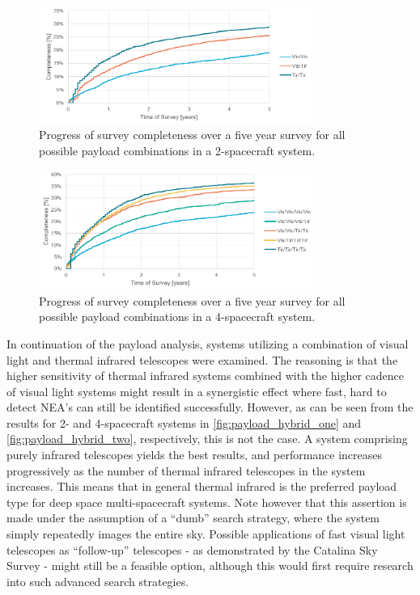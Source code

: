 \begin{figure}[htbp]
 \centering
 \includegraphics[width=0.8\textwidth]{img/tir_vs_vis_2_hybrid.png}
 \caption{Progress of survey completeness over a five year survey for all possible payload combinations in a 2-spacecraft system.}
 \label{fig:payload_hybrid_one}
\end{figure}

\begin{figure}[htbp]
 \centering
 \includegraphics[width=0.8\textwidth]{img/tir_vs_vis_4_hybrid.png}
 \caption{Progress of survey completeness over a five year survey for all possible payload combinations in a 4-spacecraft system.}
 \label{fig:payload_hybrid_two}
\end{figure}

In continuation of the payload analysis, systems utilizing a combination of visual light and thermal infrared telescopes were examined. The reasoning is that the higher sensitivity of thermal infrared systems combined with the higher cadence of visual light systems might result in a synergistic effect where fast, hard to detect NEA's can still be identified successfully. However, as can be seen from the results for 2- and 4-spacecraft systems in \autoref{fig:payload_hybrid_one} and \autoref{fig:payload_hybrid_two}, respectively, this is not the case. A system comprising purely infrared telescopes yields the best results, and performance increases progressively as the number of thermal infrared telescopes in the system increases. This means that in general thermal infrared is the preferred payload type for deep space multi-spacecraft systems. Note however that this assertion is made under the assumption of a ``dumb'' search strategy, where the system simply repeatedly images the entire sky. Possible applications of fast visual light telescopes as ``follow-up'' telescopes - as demonstrated by the Catalina Sky Survey - might still be a feasible option, although this would first require research into such advanced search strategies.

